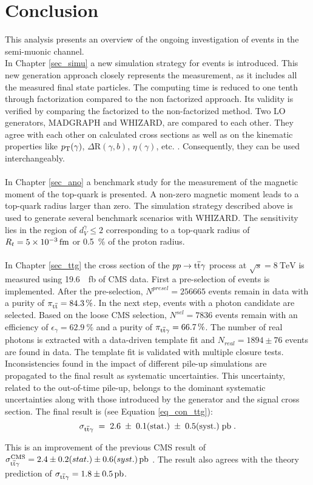 \chapter{Conclusion}

This analysis presents an overview of the ongoing investigation of \ttgamma events in the semi-muonic channel. \\
In Chapter \ref{sec_simu} a new simulation strategy for \ttgamma events is introduced. This new generation approach closely represents the measurement, as it includes all the measured final state particles. The computing time is reduced to one tenth through factorization compared to the non factorized approach. Its validity is verified by comparing the factorized to the non-factorized method.
Two LO generators, MADGRAPH and WHIZARD, are compared to each other. They agree with each other on calculated cross sections as well as on the kinematic properties like $p_{\mathrm{T}} (\gamma)$, $\Delta \mathrm{R} (\gamma,b)$, $\eta (\gamma)$, etc. . Consequently, they can be used interchangeably. \\
\\
In Chapter \ref{sec_ano} a benchmark study for the measurement of the magnetic moment of the top-quark is presented. A non-zero magnetic moment leads to a top-quark radius larger than zero.  The simulation strategy described above is used to generate several benchmark scenarios with WHIZARD. The sensitivity lies in the region of $d_V^{\gamma} \leq 2$ corresponding to a top-quark radius of $R_t=\SI{5d-3}{\femto \meter}$ or \SI{0.5}{\percent} of the proton radius.\\
\\
In Chapter \ref{sec_ttg} the cross section of the $pp \to \mathrm{t}\overline{\mathrm{t}} \gamma$ process at $\sqrt{s} = \SI{8}{\tera \electronvolt}$ is measured using \SI{19.6}{\per \femto \barn} of CMS data. First a pre-selection of \ttbar events is implemented. After the pre-selection, $N^{presel} =256665$ events remain in data with a purity of $\pi_{\mathrm{t}\overline{\mathrm{t}}} = \SI{84.3}{\percent}$. In the next step, events with a photon candidate are selected. Based on the loose CMS selection, $N^{sel} = 7836$ events remain with an efficiency of $\epsilon_\gamma = \SI{62.9}{\percent}$ and a purity of $\pi_{\mathrm{t}\overline{\mathrm{t}} \gamma} = \SI{66.7}{\percent}$. The number of real photons is extracted with a data-driven template fit and $N_{real} = 1894 \pm 76$ \ttgamma events are found in data. The template fit is validated with multiple closure tests. Inconsistencies found in the impact of different pile-up simulations are propagated to the final result as systematic uncertainties. This uncertainty, related to the out-of-time pile-up, belongs to the dominant systematic uncertainties along with those introduced by the generator and the signal cross section. The final result is (see Equation \ref{eq_con_ttg}):
\begin{equation}
\sigma_{\ttgamma} \; =\; 2.6\;\pm \;0.1\mathrm{ (stat.)} \;\pm \;0.5\mathrm{ (syst.)}\; \SI{}{\pico \barn} \; .
\label{eq_con_ttg}
\end{equation}

This is an improvement of the previous CMS result of $\sigma_{\ttgamma}^{\mathrm{CMS}} = \SI[parse-numbers=false]{2.4 \pm 0.2(stat.) \pm 0.6(syst.)}{\pico \barn}$ . The result also agrees with the theory prediction of $\sigma_{\ttgamma} = \SI{1.8 \pm 0.5}{\pico \barn}$.\\